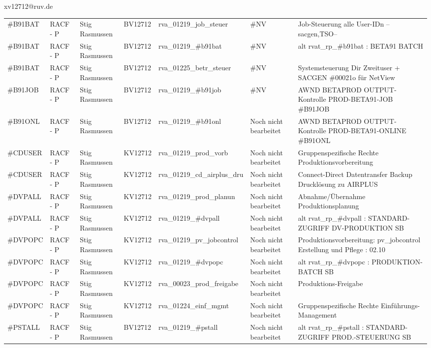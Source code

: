 \documentclass[a4paper,landscape,12pt]{letter}
\begin{document}
\begin{letter}{xv12712@ruv.de\hfill \break}
\begin{tiny}
\begin{longtable}{|p{35mm}|p{15mm}|p{25mm}|p{10mm}|p{40mm}|p{50mm}|p{50mm}|}
\#B91BAT & RACF - P & Stig Rasmussen & BV12712 & rva\_01219\_job\_steuer & \#NV & Job-Steuerung alle User-IDn --sacgen,TSO-- \\
\#B91BAT & RACF - P & Stig Rasmussen & BV12712 & rva\_01219\_\#b91bat & \#NV & alt rvat\_rp\_\#b91bat          : BETA91 BATCH \\
\#B91BAT & RACF - P & Stig Rasmussen & BV12712 & rva\_01225\_betr\_steuer & \#NV & Systemsteuerung Dir Zweituser + SACGEN \#00021o für NetView \\
\#B91JOB & RACF - P & Stig Rasmussen & BV12712 & rva\_01219\_\#b91job & \#NV & AWND BETAPROD OUTPUT-Kontrolle PROD-BETA91-JOB \#B91JOB \\
\#B91ONL & RACF - P & Stig Rasmussen & BV12712 & rva\_01219\_\#b91onl & Noch nicht bearbeitet & AWND BETAPROD OUTPUT-Kontrolle PROD-BETA91-ONLINE \#B91ONL \\
\#CDUSER & RACF - P & Stig Rasmussen & KV12712 & rva\_01219\_prod\_vorb & Noch nicht bearbeitet & Gruppenspezifische Rechte Produktionsvorbereitung \\
\#CDUSER & RACF - P & Stig Rasmussen & KV12712 & rva\_01219\_cd\_airplus\_dru & Noch nicht bearbeitet & Connect-Direct Datentransfer Backup Drucklösung zu AIRPLUS \\
\#DVPALL & RACF - P & Stig Rasmussen & KV12712 & rva\_01219\_prod\_planun & Noch nicht bearbeitet & Abnahme/Übernahme Produktionsplanung \\
\#DVPALL & RACF - P & Stig Rasmussen & KV12712 & rva\_01219\_\#dvpall & Noch nicht bearbeitet & alt rvat\_rp\_\#dvpall          : STANDARD-ZUGRIFF DV-PRODUKTION SB \\
\#DVPOPC & RACF - P & Stig Rasmussen & KV12712 & rva\_01219\_pv\_jobcontrol & Noch nicht bearbeitet & Produktionsvorbereitung: pv\_jobcontrol Erstellung und Pflege : 02.10 \\
\#DVPOPC & RACF - P & Stig Rasmussen & KV12712 & rva\_01219\_\#dvpopc & Noch nicht bearbeitet & alt rvat\_rp\_\#dvpopc          : PRODUKTION-BATCH SB \\
\#DVPOPC & RACF - P & Stig Rasmussen & KV12712 & rva\_00023\_prod\_freigabe & Noch nicht bearbeitet & Produktions-Freigabe \\
\#DVPOPC & RACF - P & Stig Rasmussen & KV12712 & rva\_01224\_einf\_mgmt & Noch nicht bearbeitet & Gruppenspezifische Rechte Einführungs-Management \\
\#PSTALL & RACF - P & Stig Rasmussen & BV12712 & rva\_01219\_\#pstall & Noch nicht bearbeitet & alt rvat\_rp\_\#pstall          : STANDARD-ZUGRIFF PROD.-STEUERUNG SB \\

\end{longtable}
\end{tiny}
\end{letter}
\end{document}
